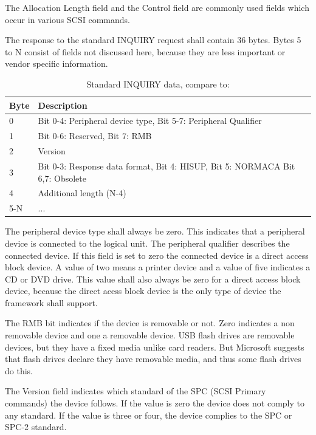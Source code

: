 The Allocation Length field and the Control field are commonly used fields which occur in various SCSI commands\cite{scsi_seagate}.

The response to the standard INQUIRY request shall contain 36 bytes\cite{scsi_seagate}. Bytes 5 to N consist of fields not discussed here, because they are less important or vendor specific information.

\begin{table}[ht]
\caption{Standard INQUIRY data, compare to: \cite{usb_ms_jan, scsi_seagate}}
\centering
\begin{tabular}{|l|l|}
\hline\hline
\textbf{Byte} & \textbf{Description}\\ \hline
0 & Bit 0-4: Peripheral device type, Bit 5-7: Peripheral Qualifier \\ \hline
1 & Bit 0-6: Reserved, Bit 7: RMB \\ \hline
2 & Version \\ \hline
3 & Bit 0-3: Response data format, Bit 4: HISUP, Bit 5: NORMACA Bit 6,7: Obsolete \\ \hline
4 & Additional length (N-4) \\ \hline
5-N & ... \\ \hline
\end{tabular}
\label{table:inquiry_data}
\end{table}

The peripheral device type shall always be zero. This indicates that a peripheral device is connected to the logical unit. The peripheral qualifier describes the connected device. If this field is set to zero the connected device is a direct access block device. A value of two means a printer device and a value of five indicates a CD or DVD drive\cite{usb_ms_jan, scsi_seagate}. This value shall also always be zero for a direct access block device, because the direct acess block device is the only type of device the framework shall support.

The RMB bit indicates if the device is removable or not. Zero indicates a non removable device and one a removable device. USB flash drives are removable devices, but they have a fixed media unlike card readers. But Microsoft suggests that flash drives declare they have removable media, and thus some flash drives do this\cite{usb_ms_jan}.

The Version field indicates which standard of the SPC (SCSI Primary commands) the device follows. If the value is zero the device does not comply to any standard. If the value is three or four, the device complies to the SPC or SPC-2 standard\cite{usb_ms_jan, scsi_seagate}.

